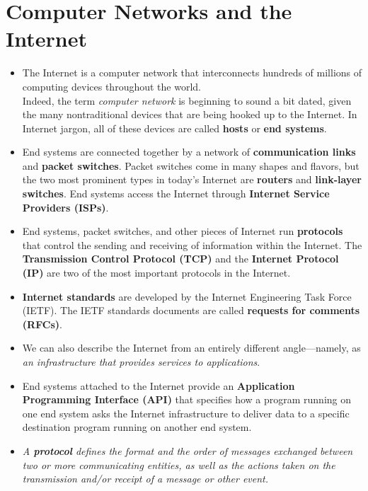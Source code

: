 \section{Computer Networks and the Internet}
\begin{itemize}

\item The Internet is a computer network that interconnects hundreds of millions of computing devices throughout the world.\\Indeed, the term \textit{computer network} is beginning to sound a bit dated, given the many nontraditional devices that are being hooked up to the Internet. In Internet jargon, all of these devices are called \textbf{hosts} or \textbf{end systems}.

\item End systems are connected together by a network of \textbf{communication links} and \textbf{packet switches}. Packet switches come in many shapes and flavors, but the two most prominent types in today's Internet are \textbf{routers} and \textbf{link-layer switches}. End systems access the Internet through \textbf{Internet Service Providers (ISPs)}.

\item End systems, packet switches, and other pieces of Internet run \textbf{protocols} that control the sending and receiving of information within the Internet. The \textbf{Transmission Control Protocol (TCP)} and the \textbf{Internet Protocol (IP)} are two of the most important protocols in the Internet.

\item \textbf{Internet standards} are developed by the Internet Engineering Task Force (IETF). The IETF standards documents are called \textbf{requests for comments (RFCs)}.

\item We can also describe the Internet from an entirely different angle---namely, as \textit{an infrastructure that provides services to applications}.

\item End systems attached to the Internet provide an \textbf{Application Programming Interface (API)} that specifies how a program running on one end system asks the Internet infrastructure to deliver data to a specific destination program running on another end system.

\item \textit{A \textbf{protocol} defines the format and the order of messages exchanged between two or more communicating entities, as well as the actions taken on the transmission and/or receipt of a message or other event.}


\end{itemize}
